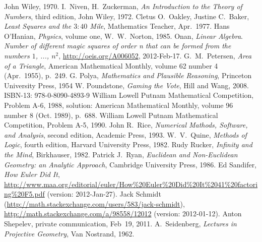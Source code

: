 \begin{thebibliography}{\makebox[2em][c]{{}\hfil{}}}
  John Wiley,
  1970.
  I.\ Niven, H.\ Zuckerman,
  \emph{An Introduction to the Theory of Numbers},
  third edition,
  John Wiley,
  1972.
  Cletus O.\ Oakley, Justine C.\ Baker,
  \emph{Least Squares and the $3:40$ Mile},
  Mathematics Teacher,
  Apr.\ 1977.
  Hans O'Hanian,
  \emph{Physics},
  volume one,
  W.\ W.\ Norton,
  1985.
  Onan,
  \emph{Linear Algebra}.
  \emph{Number of different magic squares of order n that can be formed from the numbers $1$, ..., $n^2$},
  \url{http://oeis.org/A006052},
  2012-Feb-17.
  G.\ M.\ Petersen,
  \emph{Area of a Triangle},
  American Mathematical Monthly,
  volume 62 number 4 (Apr.\ 1955),
  p.~249.
  G. Polya,
  \emph{Mathematics and Plausible Reasoning},
  Princeton University Press,
  1954
  W. Poundstone,
  \emph{Gaming the Vote},
  Hill and Wang, 2008.
  ISBN-13: 978-0-8090-4893-9 
  William Lowell Putnam Mathematical Competition,
  Problem A-6, 1988,
  solution: American Mathematical Monthly, 
  volume 96 number 8 (Oct. 1989),
  p.~688.
  William Lowell Putnam Mathematical Competition,
  Problem A-5, 1990.
  John R.\ Rice,
  \emph{Numerical Mathods, Software, and Analysis},
  second edition,
  Academic Press,
  1993.
  W.\ V.\ Quine,
  \emph{Methods of Logic},
  fourth edition,
  Harvard University Press,
  1982.
  Rudy Rucker,
  \emph{Infinity and the Mind},
  Birkhauser,
  1982.
  Patrick J.~Ryan,
  \emph{Euclidean and Non-Euclidean Geometry: an Analytic Approach},
  Cambridge University Press, 1986.
  Ed Sandifer,
  \textit{How Euler Did It},
  \url{http://www.maa.org/editorial/euler/How%20Euler%20Did%20It%2041%20factoring%20F5.pdf} (version: 2012-Jan-27).
  Jack Schmidt (\url{http://math.stackexchange.com/users/583/jack-schmidt}),
  \url{http://math.stackexchange.com/a/98558/12012} (version: 2012-01-12).
  Anton Shepelev,
  private communication,
  Feb~19, 2011.
  A.~Seidenberg,
  \emph{Lectures in Projective Geometry},
  Van Nostrand, 1962.

\end{thebibliography}
